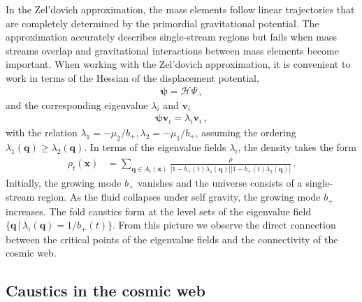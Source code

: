 \documentclass[a4paper, 11pt]{article}
\begin{document}
In the Zel'dovich approximation, the mass elements follow linear trajectories that are completely determined by the primordial gravitational potential. The approximation accurately describes single-stream regions but fails when mass streams overlap and gravitational interactions between mass elements become important. When working with the Zel'dovich approximation, it is convenient to work in terms of the Hessian of the displacement potential,
\begin{align}
\bm{\psi}=\mathcal{H}\Psi\,,
\end{align}
and the corresponding eigenvalue $\lambda_i$ and $\bm{v}_i$
\begin{align}
\bm{\psi}\bm{v}_i = \lambda_i \bm{v}_i\,,
\end{align}
with the relation $\lambda_1 =-\mu_2/b_+,\lambda_2 =-\mu_1/b_+$, assuming the ordering $\lambda_1(\bm{q}) \geq \lambda_2(\bm{q})$. In terms of the eigenvalue fields $\lambda_i$, the density takes the form 
\begin{align}
\rho_t(\bm{x})
&= \sum_{\bm{q} \in A_t(\bm{x})} \frac{\bar{\rho}}{|1-b_+(t) \lambda_1(\bm{q})||1-b_+(t) \lambda_2(\bm{q})|}\,.
\end{align}
Initially, the growing mode $b_+$ vanishes and the universe consists of a single-stream region. As the fluid collapses under self gravity, the growing mode $b_+$ increases. The fold caustics form at the level sets of the eigenvalue field $\{\bm{q}\,|\,\lambda_i(\bm{q})=1/b_+(t)\}$. From this picture we observe the direct connection between the critical points of the eigenvalue fields and the connectivity of the cosmic web.


\subsection{Caustics in the cosmic web}
\end{document}
